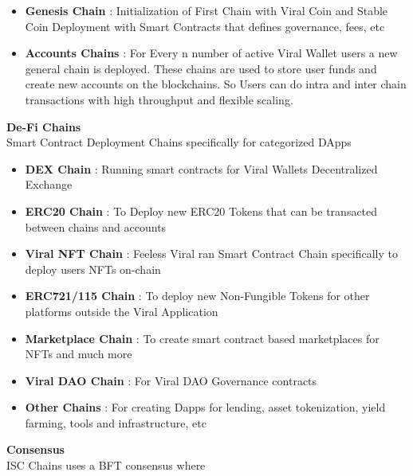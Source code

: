 \documentclass[10pt]{article}
\begin{document}
\begin{itemize}[leftmargin=+0.2in]
\item \textbf{Genesis Chain} : Initialization of First Chain with Viral Coin and Stable Coin Deployment with Smart Contracts that defines governance, fees, etc\\

\item \textbf{Accounts Chains} : For Every n number of active Viral Wallet users a new general chain is deployed. These chains are used to store user funds and create new accounts on the blockchains. So Users can do intra and inter chain transactions with high throughput and flexible scaling.\\
\end{itemize}
\textbf{De-Fi Chains}\\
Smart Contract Deployment Chains specifically for categorized DApps
\begin{itemize}[leftmargin=+0.2in]

\item \textbf{DEX Chain} : Running smart contracts for Viral Wallet\textsc{}s Decentralized Exchange

\item \textbf{ERC20 Chain} : To Deploy new ERC20 Tokens that can be transacted between chains and accounts

\item \textbf{Viral NFT Chain} : Feeless Viral ran Smart Contract Chain specifically to deploy user\textsc{}s NFTs on-chain

\item \textbf{ERC721/115 Chain} : To deploy new Non-Fungible Tokens for other platforms outside the Viral Application

\item \textbf{Marketplace Chain} : To create smart contract based marketplaces for NFTs and much more

\item \textbf{Viral DAO Chain} : For Viral DAO Governance contracts

\item \textbf{Other Chains} : For creating Dapps for lending, asset tokenization, yield farming, tools and infrastructure, etc
\end{itemize}

\textbf{Consensus}\\

ISC Chains uses a BFT consensus where 
\end{document}
